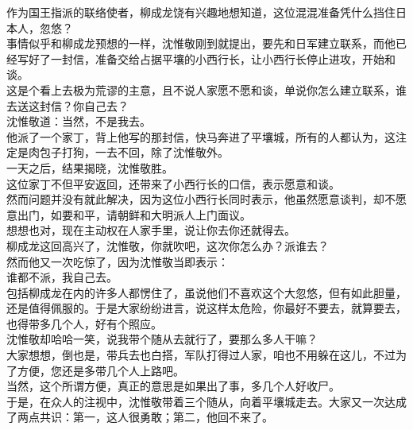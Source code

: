 \begin{multicols}{\theparacolNo}
作为国王指派的联络使者，柳成龙饶有兴趣地想知道，这位混混准备凭什么挡住日本人，忽悠？\\

事情似乎和柳成龙预想的一样，沈惟敬刚到就提出，要先和日军建立联系，而他已经写好了一封信，准备交给占据平壤的小西行长，让小西行长停止进攻，开始和谈。\\

这是个看上去极为荒谬的主意，且不说人家愿不愿和谈，单说你怎么建立联系，谁去送这封信？你自己去？\\

沈惟敬道：当然，不是我去。\\

他派了一个家丁，背上他写的那封信，快马奔进了平壤城，所有的人都认为，这注定是肉包子打狗，一去不回，除了沈惟敬外。\\

一天之后，结果揭晓，沈惟敬胜。\\

这位家丁不但平安返回，还带来了小西行长的口信，表示愿意和谈。\\

然而问题并没有就此解决，因为这位小西行长同时表示，他虽然愿意谈判，却不愿意出门，如要和平，请朝鲜和大明派人上门面议。\\

想想也对，现在主动权在人家手里，说让你去你还就得去。\\

柳成龙这回高兴了，沈惟敬，你就吹吧，这次你怎么办？派谁去？\\

然而他又一次吃惊了，因为沈惟敬当即表示：\\

谁都不派，我自己去。\\

包括柳成龙在内的许多人都愣住了，虽说他们不喜欢这个大忽悠，但有如此胆量，还是值得佩服的。于是大家纷纷进言，说这样太危险，你最好不要去，就算要去，也得带多几个人，好有个照应。\\

沈惟敬却哈哈一笑，说我带个随从去就行了，要那么多人干嘛？\\

大家想想，倒也是，带兵去也白搭，军队打得过人家，咱也不用躲在这儿，不过为了方便，您还是多带几个人上路吧。\\

当然，这个所谓方便，真正的意思是如果出了事，多几个人好收尸。\\

于是，在众人的注视中，沈惟敬带着三个随从，向着平壤城走去。大家又一次达成了两点共识：第一，这人很勇敢；第二，他回不来了。\\


\end{multicols}
